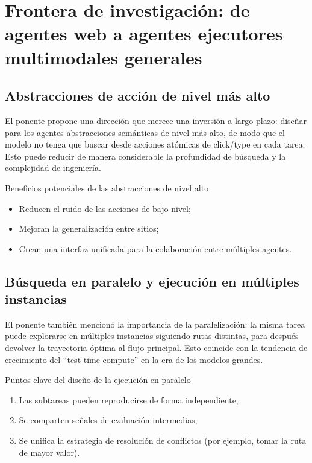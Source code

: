 \section{Frontera de investigación: de agentes web a agentes ejecutores multimodales generales}

\subsection{Abstracciones de acción de nivel más alto}
El ponente propone una dirección que merece una inversión a largo plazo: diseñar para los agentes abstracciones semánticas de nivel más alto, de modo que el modelo no tenga que buscar desde acciones atómicas de click/type en cada tarea. Esto puede reducir de manera considerable la profundidad de búsqueda y la complejidad de ingeniería.

\begin{importantbox}{Beneficios potenciales de las abstracciones de nivel alto}
\begin{itemize}
    \item Reducen el ruido de las acciones de bajo nivel;
    \item Mejoran la generalización entre sitios;
    \item Crean una interfaz unificada para la colaboración entre múltiples agentes.
\end{itemize}
\end{importantbox}

\subsection{Búsqueda en paralelo y ejecución en múltiples instancias}
El ponente también mencionó la importancia de la paralelización: la misma tarea puede explorarse en múltiples instancias siguiendo rutas distintas, para después devolver la trayectoria óptima al flujo principal. Esto coincide con la tendencia de crecimiento del ``test-time compute'' en la era de los modelos grandes.

\begin{knowledgebox}{Puntos clave del diseño de la ejecución en paralelo}
\begin{enumerate}
    \item Las subtareas pueden reproducirse de forma independiente;
    \item Se comparten señales de evaluación intermedias;
    \item Se unifica la estrategia de resolución de conflictos (por ejemplo, tomar la ruta de mayor valor).
\end{enumerate}
\end{knowledgebox}

